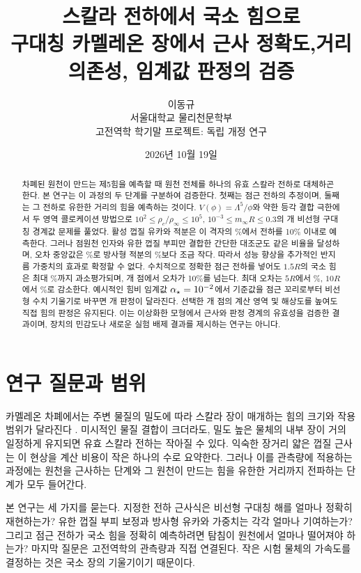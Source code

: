 \documentclass[11pt,a4paper]{article}
\title{\bfseries\Large 스칼라 전하에서 국소 힘으로\\[4pt]
\large 구대칭 카멜레온 장에서 근사 정확도,\newline 거리 의존성, 임계값 판정의 검증}
\author{이동규\\\small 서울대학교 물리천문학부\\\small 고전역학 학기말 프로젝트: 독립 개정 연구}
\date{2026년 10월 19일}
\begin{document}
\renewcommand{\abstractname}{초록}\renewcommand{\figurename}{그림}
\renewcommand{\tablename}{표}\renewcommand{\refname}{참고문헌}
\maketitle
\begin{abstract}
차폐된 원천이 만드는 제5힘을 예측할 때 원천 전체를 하나의 유효 스칼라 전하로
대체하곤 한다. 본 연구는 이 과정의 두 단계를 구분하여 검증한다. 첫째는 점근
전하의 추정이며, 둘째는 그 전하로 유한한 거리의 힘을 예측하는 것이다.
$V(\phi)=\Lambda^5/\phi$와 약한 등각 결합 극한에서 두 영역 콜로케이션 방법으로
$10^2\leq\rho_c/\rho_\infty\leq10^5$, $10^{-3}\leq m_\infty R\leq0.3$의
\StudyPoints 개 비선형 구대칭 경계값 문제를 풀었다. 활성 껍질 유카와 적분은
이 격자의 \StudyASWithin\%에서 전하를 10\% 이내로 예측한다. 그러나 점원천
인자와 유한 껍질 부피만 결합한 간단한 대조군도 같은 비율을 달성하며, 오차
중앙값은 \StudyPointMedian\%로 방사형 적분의 \StudyASMedian\%보다 조금 작다.
따라서 성능 향상을 추가적인 반지름 가중치의 효과로 확정할 수 없다. 수치적으로
정확한 점근 전하를 넣어도 $1.5R$의 국소 힘은 최대 \StudyForceNearMax\%까지
과소평가되며, \StudyForceNearFailures 개 점에서 오차가 10\%를 넘는다. 최대 오차는
$5R$에서 \StudyForceFiveMax\%, $10R$에서 \StudyForceTenMax\%로 감소한다.
예시적인 힘비 임계값 $\alpha_\star=10^{-2}$에서 기준값을 점근 꼬리로부터
비선형 수치 기울기로 바꾸면 \StudyTailFlips 개 판정이 달라진다. 선택한
\StudyAuditPoints 개 점의 계산 영역 및 해상도를 높여도 직접 힘의 판정은 유지된다.
이는 이상화한 모형에서 근사와 판정 경계의 유효성을 검증한 결과이며, 장치의
민감도나 새로운 실험 배제 결과를 제시하는 연구는 아니다.
\end{abstract}

\section{연구 질문과 범위}
카멜레온 차폐에서는 주변 물질의 밀도에 따라 스칼라 장이 매개하는 힘의 크기와
작용 범위가 달라진다 \cite{KhouryPRL,KhouryPRD}. 미시적인 물질 결합이 크더라도,
밀도 높은 물체의 내부 장이 거의 일정하게 유지되면 유효 스칼라 전하는 작아질
수 있다. 익숙한 장거리 얇은 껍질 근사는 이 현상을 계산 비용이 작은 하나의
수로 요약한다. 그러나 이를 관측량에 적용하는 과정에는 원천을 근사하는 단계와
그 원천이 만드는 힘을 유한한 거리까지 전파하는 단계가 모두 들어간다.

본 연구는 세 가지를 묻는다. 지정한 전하 근사식은 비선형 구대칭 해를 얼마나
정확히 재현하는가? 유한 껍질 부피 보정과 방사형 유카와 가중치는 각각 얼마나
기여하는가? 그리고 점근 전하가 국소 힘을 정확히 예측하려면 탐침이 원천에서
얼마나 떨어져야 하는가? 마지막 질문은 고전역학의 관측량과 직접 연결된다.
작은 시험 물체의 가속도를 결정하는 것은 국소 장의 기울기이기 때문이다.
\end{document}
